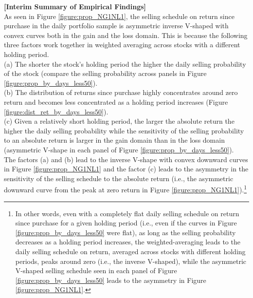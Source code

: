 \documentclass[11pt, a4paper]{article}
\begin{document}
\noindent
\textbf{[Interim Summary of Empirical Findings]}\\
As seen in Figure \ref{figure:prop_NG1NL1}, the selling schedule on return since purchase in the daily portfolio sample is asymmetric inverse V-shaped with convex curves both in the gain and the loss domain. This is because the following three factors work together in weighted averaging across stocks with a different holding period.\\

\noindent
(a) The shorter the stock's holding period the higher the daily selling probability of the stock (compare the selling probability across panels in Figure \ref{figure:prop_by_days_less50}).\\
\noindent
(b) The distribution of returns since purchase highly concentrates around zero return and becomes less concentrated as a holding period increases (Figure \ref{figure:dist_ret_by_days_less50}).\\
\noindent
(c) Given a relatively short holding period, the larger the absolute return the higher the daily selling probability while the sensitivity of the selling probability to an absolute return is larger in the gain domain than in the loss domain (asymmetric V-shape in each panel of Figure \ref{figure:prop_by_days_less50}).\\

The factors (a) and (b) lead to the inverse V-shape with convex downward curves in Figure \ref{figure:prop_NG1NL1} and the factor (c) leads to the asymmetry in the sensitivity of the selling schedule to the absolute return (i.e., the asymmetric downward curve from the peak at zero return in Figure \ref{figure:prop_NG1NL1}).\footnote{In other words, even with a completely flat daily selling schedule on return since purchase for a given holding period (i.e., even if the curves in Figure \ref{figure:prop_by_days_less50} were flat), as long as the selling probability decreases as a holding period increases, the weighted-averaging leads to the daily selling schedule on return, averaged across stocks with different holding periods, peaks around zero (i.e., the inverse V-shaped), while the asymmetric V-shaped selling schedule seen in each panel of Figure \ref{figure:prop_by_days_less50} leads to the asymmetry in Figure \ref{figure:prop_NG1NL1}.} 
\end{document}
